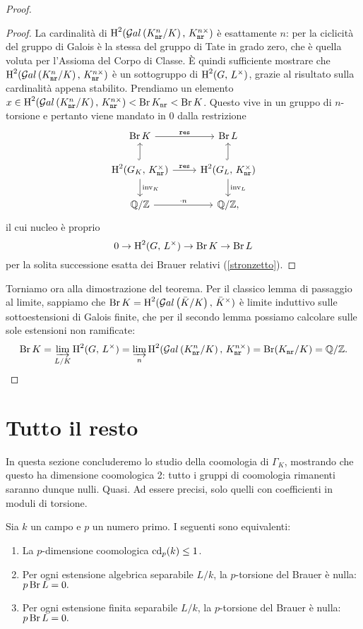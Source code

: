 \begin{proof}
\begin{proof}
	La cardinalità di $ \operatorname{H}^2(\mathcal{G}al\left( K_\mathtt{nr}^n/K \right),\, K_\mathtt{nr}^{n\times}) $ è esattamente $ n $: per la ciclicità del gruppo di Galois è la stessa del gruppo di Tate in grado zero, che è quella voluta per l'Assioma del Corpo di Classe. È quindi sufficiente mostrare che $ \operatorname{H}^2(\mathcal{G}al\left( K_\mathtt{nr}^n/K \right),\, K_\mathtt{nr}^{n\times}) $ è un sottogruppo di $ \operatorname{H}^2(G,\, L^\times ) $, grazie al risultato sulla cardinalità appena stabilito.
	Prendiamo un elemento $ x \in \operatorname{H}^2(\mathcal{G}al\left( K_\mathtt{nr}^n/K \right),\, K_\mathtt{nr}^{n\times}) < \operatorname{Br} K_\mathtt{nr} < \operatorname{Br} K $. Questo vive in un gruppo di $ n $-torsione e pertanto viene mandato in $ 0 $ dalla restrizione
	\[ \begin{tikzcd}
	\Br \K \rar["\Res"]
	& \Br L \\
	\HH^2(G_\K, \, \knr^\times) \rar["\Res"] \dar["\inv_\K"] \arrow[hook]{u}
	& \HH^2(G_L, \, \knr^\times) \dar["\inv_L"] \arrow[hook]{u} \\
	\Q/\Z \rar["\cdot n"]
	& \Q/\Z,
	\end{tikzcd} \]
	il cui nucleo è proprio
	\[ 0 \to \operatorname{H}^2(G, \, L^\times) \to \operatorname{Br} K \to \operatorname{Br} L \]
	per la solita successione esatta dei Brauer relativi (\ref{stronzetto}).
\end{proof}

Torniamo ora alla dimostrazione del teorema. Per il classico lemma di passaggio al limite, sappiamo che $ \operatorname{Br} K = \operatorname{H}^2(\mathcal{G}al\left( \bar{K}/K \right), \, \bar{K}^\times) $ è limite induttivo sulle sottoestensioni di Galois finite, che per il secondo lemma possiamo calcolare sulle sole estensioni non ramificate:
\[ \operatorname{Br} K = \varinjlim_{L/K} \operatorname{H}^2(G, \, L^\times) = \varinjlim_{n} \operatorname{H}^2(\mathcal{G}al\left( K_\mathtt{nr}^n/K \right),\, K_\mathtt{nr}^{n\times}) = \operatorname{Br} (K_\mathtt{nr} /K) = \mathbb{Q}/\mathbb{Z}. \]

\end{proof}

\section{Tutto il resto}
In questa sezione concluderemo lo studio della coomologia di $ \Gamma_K $, mostrando che questo ha dimensione coomologica 2: tutto i gruppi di coomologia rimanenti saranno dunque nulli. Quasi. Ad essere precisi, solo quelli con coefficienti in moduli di torsione.

\begin{lemma}
	Sia $ k $ un campo e $ p $ un numero primo. I seguenti sono equivalenti:
	\begin{enumerate}
		\item La $ p $-dimensione coomologica $ \operatorname{cd}_p(k) \leq 1 $.
		\item Per ogni estensione algebrica separabile $ L/k $, la $ p $-torsione del Brauer è nulla: $ p \operatorname{Br} L = 0. $
		\item Per ogni estensione finita separabile $ L/k $, la $ p $-torsione del Brauer è nulla: $ p \operatorname{Br} L = 0. $
	\end{enumerate}
\end{lemma}

